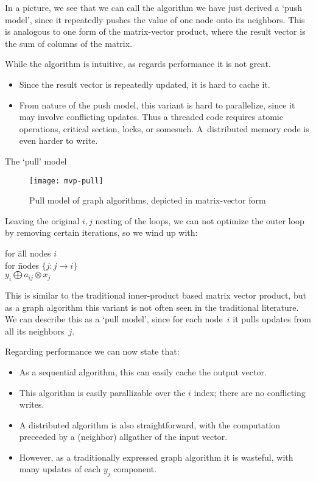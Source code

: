 In a picture, we see that we can call the algorithm we have just derived
a `push model',
since it repeatedly pushes the value of one node onto its neighbors.
This is analogous to one form of the matrix-vector product,
where the result vector is the sum of columns of the matrix.

While the algorithm is intuitive, as regards performance it is not great.
\begin{itemize}
\item Since the result vector is repeatedly updated, it is hard to cache it.
\item From nature of the push model, this variant is hard to parallelize,
  since it may involve conflicting updates.
  Thus a threaded code requires atomic operations, critical section, locks,
  or somesuch. A~distributed memory code is even harder to write.
\end{itemize}

 {The `pull' model}

\begin{figure}[ht]
  \texttt{[image: mvp-pull]}
  \caption{Pull model of graph algorithms, depicted in matrix-vector form}
  \label{fig:mvp-pull}
\end{figure}

Leaving the original $i,j$ nesting of the loops,
we can not optimize the outer loop by removing certain iterations,
so we wind up with:

\begin{tabbing}
for \=all nodes $i$\\
\> for \=nodes $\{ j\colon j\rightarrow i\}$\\
\>\> $y_i \bigoplus a_{ij}\otimes x_j$\\
\end{tabbing}

This is similar to the traditional inner-product based matrix vector product,
but as a graph algorithm this variant is not often seen in the traditional literature.
We can describe this as a `pull model', since for each node~$i$ it pulls updates
from all its neighbors~$j$.

Regarding performance we can now state that:
\begin{itemize}
\item As a sequential algorithm, this can easily cache the output vector.
\item This algorithm is easily parallizable over the $i$ index;
  there are no conflicting writes.
\item A distributed algorithm is also straightforward, with the computation
  preceeded by a (neighbor) allgather of the input vector.
\item However, as a traditionally expressed graph algorithm it is wasteful,
  with many updates of each $y_j$ component.
\end{itemize}

